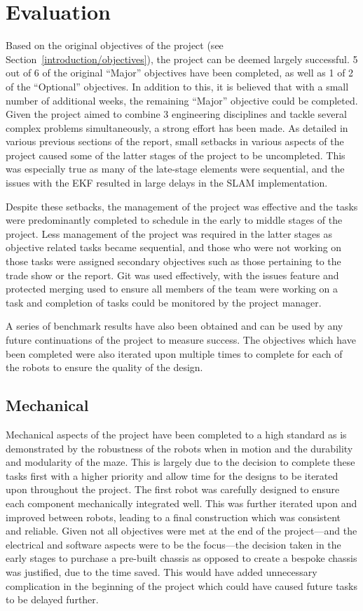 
\chapter{Evaluation}\label{eval}
Based on the original objectives of the project (see Section~\ref{introduction/objectives}), the project can be deemed largely successful. 5 out of 6 of
the original ``Major'' objectives have been completed, as well as 1 of 2 of
the ``Optional'' objectives. In addition to this, it is believed that with a
small number of additional weeks, the remaining ``Major'' objective could
be completed. Given the project aimed to combine 3 engineering
disciplines and tackle several complex problems simultaneously, a strong
effort has been made.
As detailed in various previous sections of the report, small setbacks in
various aspects of the project caused some of the latter stages of the project to be
uncompleted. This was especially true as many of the late-stage elements were sequential,
and the issues with the EKF resulted in large delays in the SLAM implementation.

Despite these setbacks, the management of the project was effective and the tasks were predominantly completed to schedule in the early to middle
stages of the project. Less management of the project was required in the latter
stages as objective related tasks became sequential, and those who were not
working on those tasks were assigned secondary objectives such as those
pertaining to the trade show or the report. Git was used effectively, with the
issues feature and protected merging used to ensure all members of the team were
working on a task and completion of tasks could be monitored by the project
manager.

A series of benchmark results have also been obtained and can be used by any future
continuations of the project to measure success. The
objectives which have been completed were also iterated upon multiple times to
complete for each of the robots to ensure the quality of the design.

\section{Mechanical}\label{eval/mech}
Mechanical aspects of the project have been completed to a
high standard as is demonstrated by the robustness of the robots when in
motion and the durability and modularity of the maze. This is largely due to the
decision to complete these tasks first with a higher priority and allow time for the
designs to be iterated upon throughout the project. The first robot was carefully
designed to ensure each component mechanically integrated well. This was further
iterated upon and improved between robots, leading to a final construction which was
consistent and reliable. Given not all objectives were met at the end of the project---and the electrical and software aspects were to be the focus---the decision taken in the
early stages to purchase a pre-built chassis as opposed to create a bespoke chassis
was justified, due to the time saved. This would have added unnecessary complication
in the beginning of the project which could have caused future
tasks to be delayed further.

